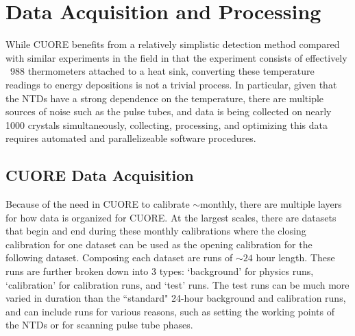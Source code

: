 \chapter{Data Acquisition and Processing}
\label{ch:Data Acquisition and Processing}

While CUORE benefits from a relatively simplistic detection method compared with similar experiments in the field in that the experiment consists of effectively ~988 thermometers attached to a heat sink, converting these temperature readings to energy depositions is not a trivial process.
In particular, given that the NTDs have a strong dependence on the temperature, there are multiple sources of noise such as the pulse tubes, and data is being collected on nearly 1000 crystals simultaneously, collecting, processing, and optimizing this data requires automated and parallelizeable software procedures.

\section{CUORE Data Acquisition}
Because of the need in CUORE to calibrate $\sim$monthly, there are multiple layers for how data is organized for CUORE.
At the largest scales, there are datasets that begin and end during these monthly calibrations where the closing calibration for one dataset can be used as the opening calibration for the following dataset.
Composing each dataset are runs of $\sim24$ hour length.
These runs are further broken down into 3 types: `background' for physics runs, `calibration' for calibration runs, and `test' runs.
The test runs can be much more varied in duration than the ``standard" 24-hour background and calibration runs, and can include runs for various reasons, such as setting the working points of the NTDs or for scanning pulse tube phases.


